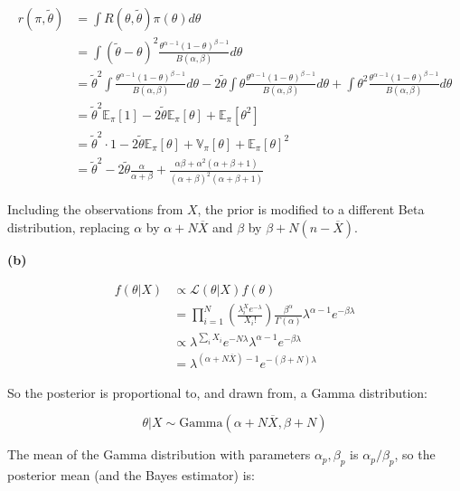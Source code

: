 \begin{align}
r(\pi, \tilde{\theta}) &= \int R(\theta, \tilde{\theta}) \pi(\theta) d\theta \\
&= \int (\tilde{\theta} - \theta)^2 \frac{\theta^{\alpha - 1}(1 - \theta)^{\beta - 1}}{B(\alpha, \beta)} d\theta \\
&= \tilde{\theta}^2 \int \frac{\theta^{\alpha - 1}(1 - \theta)^{\beta - 1}}{B(\alpha, \beta)} d\theta
- 2 \tilde{\theta} \int \theta \frac{\theta^{\alpha - 1}(1 - \theta)^{\beta - 1}}{B(\alpha, \beta)} d\theta
+ \int \theta^2 \frac{\theta^{\alpha - 1}(1 - \theta)^{\beta - 1}}{B(\alpha, \beta)} d\theta \\
&= \tilde{\theta}^2 \mathbb{E}_\pi[1] - 2 \tilde{\theta} \mathbb{E}_\pi[\theta] + \mathbb{E}_\pi[\theta^2]  \\
&= \tilde{\theta}^2 \cdot 1 - 2 \tilde{\theta} \mathbb{E}_\pi[\theta] + \mathbb{V}_\pi[\theta] + \mathbb{E}_\pi[\theta]^2 \\ 
&= \tilde{\theta}^2 - 2 \tilde{\theta} \frac{\alpha}{\alpha + \beta}
+ \frac{\alpha\beta + \alpha^2(\alpha + \beta + 1)}{(\alpha + \beta)^2(\alpha + \beta + 1)}
\end{align}

Including the observations from \(X\), the prior is modified to a
different Beta distribution, replacing \(\alpha\) by
\(\alpha + N \overline{X}\) and \(\beta\) by
\(\beta + N(n - \overline{X})\).

\textbf{(b)}

\begin{align}
f(\theta | X) &\propto \mathcal{L}(\theta | X) f(\theta) \\
&= \prod_{i = 1}^N \left( \frac{\lambda^X_i e^{-\lambda}}{X_i!} \right) \frac{\beta^\alpha}{\Gamma(\alpha)}\lambda^{\alpha - 1}e^{-\beta \lambda} \\
& \propto \lambda^{\sum_i X_i} e^{-N \lambda} \lambda^{\alpha - 1} e^{-\beta \lambda} \\
&= \lambda^{\left(\alpha + N \overline{X}\right) - 1} e^{-(\beta + N) \lambda}
\end{align}

So the posterior is proportional to, and drawn from, a Gamma
distribution:

\[ \theta | X \sim \text{Gamma}\left(\alpha + N \overline{X}, \beta + N \right)\]

The mean of the Gamma distribution with parameters \(\alpha_p, \beta_p\)
is \(\alpha_p / \beta_p\), so the posterior mean (and the Bayes
estimator) is:


